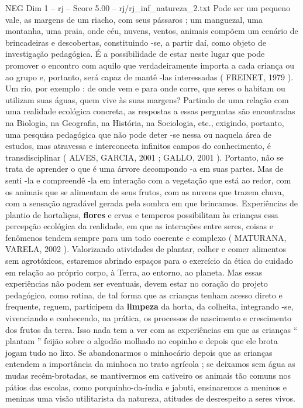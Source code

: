\begin{textsample}{NEG Dim 1 – rj – Score 5.00 – rj/rj\_inf\_natureza\_2.txt}
Pode ser um pequeno vale, as margens de um riacho, com seus pássaros ; um manguezal, uma montanha, uma praia, onde céu, nuvens, ventos, animais compõem um cenário de brincadeiras e descobertas, constituindo -se, a partir daí, como objeto de investigação pedagógica.
É a possibilidade de estar neste lugar que pode promover o encontro com aquilo que verdadeiramente importa a cada criança ou ao grupo e, portanto, será capaz de mantê -las interessadas ( FREINET, 1979 ).
Um rio, por exemplo : de onde vem e para onde corre, que seres o habitam ou utilizam suas águas, quem vive às suas margens?
Partindo de uma relação com uma realidade ecológica concreta, as respostas a essas perguntas são encontradas na Biologia, na Geografia, na História, na Sociologia, etc., exigindo, portanto, uma pesquisa pedagógica que não pode deter -se nessa ou naquela área de estudos, mas atravessa e interconecta infinitos campos do conhecimento, é transdisciplinar ( ALVES, GARCIA, 2001 ; GALLO, 2001 ).
Portanto, não se trata de aprender o que é uma árvore decompondo -a em suas partes.
Mas de senti -la e compreendê -la em interação com a vegetação que está ao redor, com os animais que se alimentam de seus frutos, com as nuvens que trazem chuva, com a sensação agradável gerada pela sombra em que brincamos.
Experiências de plantio de hortaliças, \textbf{flores} e ervas e temperos possibilitam às crianças essa percepção ecológica da realidade, em que as interações entre seres, coisas e fenômenos tendem sempre para um todo coerente e complexo ( MATURANA, VARELA, 2002 ).
Valorizando atividades de plantar, colher e comer alimentos sem agrotóxicos, estaremos abrindo espaços para o exercício da ética do cuidado em relação ao próprio corpo, à Terra, ao entorno, ao planeta.
Mas essas experiências não podem ser eventuais, devem estar no coração do projeto pedagógico, como rotina, de tal forma que as crianças tenham acesso direto e frequente, reguem, participem da \textbf{limpeza} da horta, da colheita, integrando -se, vivenciando e conhecendo, na prática, os processos de nascimento e crescimento dos frutos da terra.
Isso nada tem a ver com as experiências em que as crianças “ plantam ” feijão sobre o algodão molhado no copinho e depois que ele brota jogam tudo no lixo.
Se abandonarmos o minhocário depois que as crianças entendem a importância da minhoca no trato agrícola ; se deixamos sem água as mudas recém-brotadas, se mantivermos em cativeiro os animais tão comuns nos pátios das escolas, como porquinho-da-índia e jabuti, ensinaremos a meninos e meninas uma visão utilitarista da natureza, atitudes de desrespeito a seres vivos.

\end{textsample}
